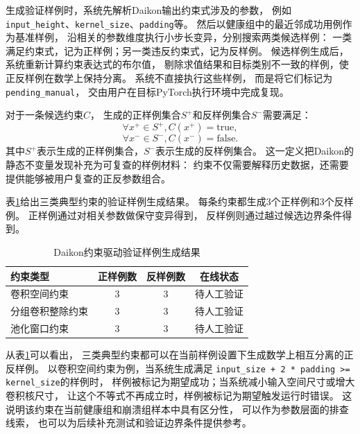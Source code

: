 生成验证样例时，系统先解析Daikon输出约束式涉及的参数，
例如\texttt{input\_height}、\texttt{kernel\_size}、\texttt{padding}等。
然后以健康组中的最近邻成功用例作为基准样例，
沿相关的参数维度执行小步长变异，分别搜索两类候选样例：
一类满足约束式，记为正样例；另一类违反约束式，记为反样例。
候选样例生成后，系统重新计算约束表达式的布尔值，
剔除求值结果和目标类别不一致的样例，使正反样例在数学上保持分离。
系统不直接执行这些样例，
而是将它们标记为\texttt{pending\_manual}，
交由用户在目标PyTorch执行环境中完成复现。

对于一条候选约束$C$，
生成的正样例集合$S^+$和反样例集合$S^-$需要满足：
\begin{equation}
\label{eq:pos_sample_val}
\forall x^+ \in S^+, C(x^+)=\mathrm{true},
\end{equation}
\begin{equation}
\label{eq:neg_sample_val}
\forall x^- \in S^-, C(x^-)=\mathrm{false}.
\end{equation}
其中$S^+$表示生成的正样例集合，$S^-$表示生成的反样例集合。
这一定义把Daikon的静态不变量发现补充为可复查的样例材料：
约束不仅需要解释历史数据，还需要提供能够被用户复查的正反参数组合。

表\ref{tab:daikon_validation}给出三类典型约束的验证样例生成结果。
每条约束都生成3个正样例和3个反样例。
正样例通过对相关参数做保守变异得到，
反样例则通过越过候选边界条件得到。

\begin{table}[htbp]
\centering
\caption{Daikon约束驱动验证样例生成结果}
\label{tab:daikon_validation}
\begin{tabular}{lccc}
\toprule
约束类型 & 正样例数 & 反样例数 & 在线状态 \\
\midrule
卷积空间约束 & 3 & 3 & 待人工验证 \\
分组卷积整除约束 & 3 & 3 & 待人工验证 \\
池化窗口约束 & 3 & 3 & 待人工验证 \\
\bottomrule
\end{tabular}
\end{table}

从表\ref{tab:daikon_validation}可以看出，
三类典型约束都可以在当前样例设置下生成数学上相互分离的正反样例。
以卷积空间约束为例，当系统生成满足
\texttt{input\_size + 2 * padding >= kernel\_size}的样例时，
样例被标记为期望成功；当系统减小输入空间尺寸或增大卷积核尺寸，
让这个不等式不再成立时，样例被标记为期望触发运行时错误。
这说明该约束在当前健康组和崩溃组样本中具有区分性，
可以作为参数层面的排查线索，
也可以为后续补充测试和验证边界条件提供参考。

